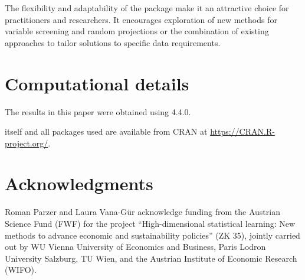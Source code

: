 \documentclass[
  article]{jss}
\begin{document}
The flexibility and adaptability of the  package make it an
attractive choice for practitioners and researchers. It encourages
exploration of new methods for variable screening and random projections
or the combination of existing approaches to tailor solutions to
specific data requirements.

\section*{Computational details}\label{computational-details}

The results in this paper were obtained using  4.4.0.

 itself and all packages used are available from CRAN at
\url{https://CRAN.R-project.org/}.

\section*{Acknowledgments}\label{acknowledgments}

Roman Parzer and Laura Vana-Gür acknowledge funding from the Austrian
Science Fund (FWF) for the project ``High-dimensional statistical
learning: New methods to advance economic and sustainability policies''
(ZK 35), jointly carried out by WU Vienna University of Economics and
Business, Paris Lodron University Salzburg, TU Wien, and the Austrian
Institute of Economic Research (WIFO).


\renewcommand\refname{References}
  
\end{document}
